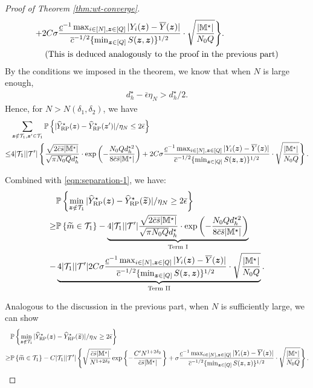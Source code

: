 \documentclass[12pt]{article}
\begin{document}
\begin{proof}[Proof of Theorem \ref{thm:wt-converge}]
\begin{align*}
    + & 2C\sigma   \frac{ \underline{c}^{-1} \max_{i\in[N],{\boldsymbol{z}}\in[Q]}|Y_i({\boldsymbol{z}})-\overline{Y}({\boldsymbol{z}})|}{ {\overline{c}^{-1/2} \{\min_{{\boldsymbol{z}}\in[Q]} S({\boldsymbol{z}},{\boldsymbol{z}})}\}^{1/2}}\cdot \sqrt{\frac{|{\mathbb{M}}^\star|}{N_0Q}}\Bigg\}. \\
    & \text{ (This is deduced analogously to the proof in the previous part)}
\end{align*}
By the conditions we imposed in the theorem, we know that when $N$ is large enough,
\begin{align*}
    d_h^\star - \bar{\epsilon}\eta_N > d_h^\star/2.
\end{align*}
Hence, for $N>N(\delta_1,\delta_2)$, we have
\begin{align*}
    &\sum_{{\boldsymbol{z}}\notin {\mathcal{T}}_{1}, {\boldsymbol{z}}'\in{\mathcal{T}}_{1}}{\mathbb{P}}\left\{|{\widehat{Y}}^\star_{\operatorname{RP}}({\boldsymbol{z}}) - {\widehat{Y}}^\star_{\operatorname{RP}}({\boldsymbol{z}}')|/\eta_N \le 2\bar{\epsilon}\right\} \\
    \le & 4|{\mathcal{T}}_{1}| |{\mathcal{T}}'|\left\{ \frac{\sqrt{2\bar{c}\bar{s}|{\mathbb{M}}^\star|}}{\sqrt{\pi N_0Q }{d_h^\star}}\cdot \exp\left(-\frac{ N_0Q d_h^{\star 2}}{8\bar{c}\bar{s}|{\mathbb{M}}^\star|}\right)
    +  2C\sigma   \frac{ \underline{c}^{-1} \max_{i\in[N],{\boldsymbol{z}}\in[Q]}|Y_i({\boldsymbol{z}})-\overline{Y}({\boldsymbol{z}})|}{ {\overline{c}^{-1/2} \{\min_{{\boldsymbol{z}}\in[Q]} S({\boldsymbol{z}},{\boldsymbol{z}})}\}^{1/2}}\cdot \sqrt{\frac{|{\mathbb{M}}^\star|}{N_0Q}}\right\}.
\end{align*}


Combined with \eqref{eqn:separation-1},  we have:
\begin{align}
    &{\mathbb{P}}\left\{\min_{{\boldsymbol{z}}\notin {\mathcal{T}}_{1}}|{\widehat{Y}}^\star_{\operatorname{RP}}({\boldsymbol{z}}) - {\widehat{Y}}^\star_{\operatorname{RP}}(\widetilde{{\boldsymbol{z}}})|/\eta_N \ge 2\bar{\epsilon}\right\} \notag\\
    \ge & {\mathbb{P}}\left\{\widetilde{m}\in {\mathcal{T}}_{1}\right\} -   \underbrace{4|{\mathcal{T}}_{1}| |{\mathcal{T}}'|  \frac{\sqrt{2\bar{c}\bar{s}|{\mathbb{M}}^\star|}}{\sqrt{\pi N_0Q }{d_h^\star}}\cdot \exp\left(-\frac{ N_0Q d_h^{\star 2}}{8\bar{c}\bar{s}|{\mathbb{M}}^\star|}\right)}_{\text{Term I}}\notag\\
    - &  \underbrace{4|{\mathcal{T}}_{1}| |{\mathcal{T}}'| 2C\sigma   \frac{ \underline{c}^{-1} \max_{i\in[N],{\boldsymbol{z}}\in[Q]}|Y_i({\boldsymbol{z}})-\overline{Y}({\boldsymbol{z}})|}{ {\overline{c}^{-1/2} \{\min_{{\boldsymbol{z}}\in[Q]} S({\boldsymbol{z}},{\boldsymbol{z}})}\}^{1/2}}\cdot \sqrt{\frac{|{\mathbb{M}}^\star|}{N_0Q}}}_{\text{Term II}}. \label{eqn:large}
\end{align}

Analogous to the discussion in the previous part, when $N$ is sufficiently large, we can show
\begin{align*}
    &{\mathbb{P}}\left\{\min_{{\boldsymbol{z}}\notin {\mathcal{T}}_{1}}|{\widehat{Y}}^\star_{\operatorname{RP}}({\boldsymbol{z}}) - {\widehat{Y}}^\star_{\operatorname{RP}}(\widetilde{{\boldsymbol{z}}})|/\eta_N \ge 2\bar{\epsilon}\right\} \\
    \ge & {\mathbb{P}}\left\{\widetilde{m}\in {\mathcal{T}}_{1}\right\} - C|{\mathcal{T}}_{1}| |{\mathcal{T}}'| \left\{\sqrt{\frac{\bar{c}\bar{s}|{\mathbb{M}}^\star|}{N^{1+2\delta_2}}}\exp\left\{-\frac{C'N^{1+2\delta_2}}{\bar{c}\bar{s}|{\mathbb{M}}^\star|}\right\} + \sigma   \frac{ \underline{c}^{-1} \max_{i\in[N],{\boldsymbol{z}}\in[Q]}|Y_i({\boldsymbol{z}})-\overline{Y}({\boldsymbol{z}})|}{ {\overline{c}^{-1/2} \{\min_{{\boldsymbol{z}}\in[Q]} S({\boldsymbol{z}},{\boldsymbol{z}})}\}^{1/2}}\cdot \sqrt{\frac{|{\mathbb{M}}^\star|}{N_0Q}}\right\}.
\end{align*}


\end{proof}
\end{document}
